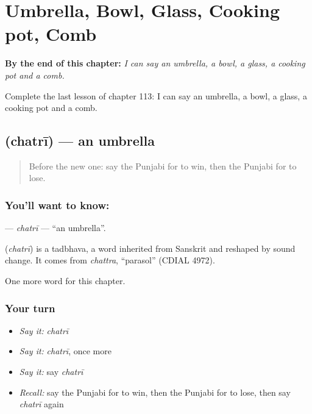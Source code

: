 
\chapter{Umbrella, Bowl, Glass, Cooking pot, Comb}
\label{ch:pa-umbrella-bowl-glass-cooking-pot-comb}

\begin{chapteropening}
\textbf{By the end of this chapter:} \emph{I can say an umbrella, a bowl, a glass, a cooking pot and a comb.}

Complete the last lesson of chapter 113: I can say an umbrella, a bowl, a glass, a cooking pot and a comb.
\end{chapteropening}

\section[\texorpdfstring{\pa{ਛਤਰੀ} (chatrī)}{ਛਤਰੀ (chatrī)}]{ (chatrī) — an umbrella}

\label{lesson:PA-C113-chatri}



\begin{quote}
Before the new one: say the Punjabi for to win, then the Punjabi for to lose.
\end{quote}

\subsection*{You'll want to know: }
\textbf{} — \emph{chatrī} — \textquotedblleft{}an umbrella\textquotedblright{}.

\begin{cousinweb}
\textbf{} (\emph{chatrī}) is a tadbhava, a word inherited from Sanskrit and reshaped by sound change. It comes from \emph{chattra}, \textquotedblleft{}parasol\textquotedblright{} (CDIAL 4972).
\end{cousinweb}

\begin{grammarlens}[title={What you've built}]
One more word for this chapter.
\end{grammarlens}

\subsection*{Your turn}
\begin{itemize}
\raggedright
  \item \emph{Say it:} \emph{chatrī}
  \item \emph{Say it:} \emph{chatrī}, once more
  \item \emph{Say it:} say \emph{chatrī}
  \item \emph{Recall:} say the Punjabi for to win, then the Punjabi for to lose, then say \emph{chatrī} again
\end{itemize}

